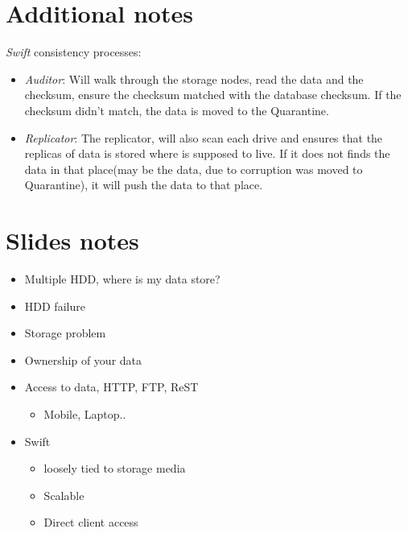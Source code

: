 \documentclass{article}
\begin{document}
\section{Additional notes}
\label{sec-4}
\emph{Swift} consistency processes:
\begin{itemize}
\item \emph{Auditor}: Will walk through the storage nodes, read the data and
the checksum, ensure the checksum matched with the database
checksum. If the checksum didn't match, the data is moved to the
Quarantine.
\item \emph{Replicator}: The replicator, will also scan each drive and
ensures that the replicas of data is stored where is supposed to
live. If it does not finds the data in that place(may be the
data, due to corruption was moved to Quarantine), it will push
the data to that place.
\end{itemize}

\section{Slides notes}
\label{sec-5}

\begin{itemize}
\item Multiple HDD, where is my data store?
\item HDD failure
\item Storage problem

\item Ownership of your data
\item Access to data, HTTP, FTP, ReST
\begin{itemize}
\item Mobile, Laptop..
\end{itemize}

\item Swift
\begin{itemize}
\item loosely tied to storage media
\item Scalable
\item Direct client access
\end{itemize}
\end{itemize}
\end{document}
